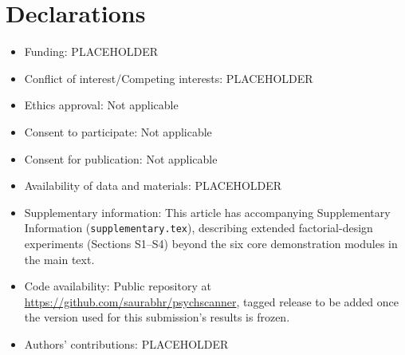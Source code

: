 \documentclass[pdflatex,sn-nature]{sn-jnl}
\begin{document}
\backmatter


\section*{Declarations}

\begin{itemize}
\item Funding: PLACEHOLDER
\item Conflict of interest/Competing interests: PLACEHOLDER
\item Ethics approval: Not applicable
\item Consent to participate: Not applicable
\item Consent for publication: Not applicable
\item Availability of data and materials: PLACEHOLDER
\item Supplementary information: This article has accompanying Supplementary
  Information (\texttt{supplementary.tex}), describing extended
  factorial-design experiments (Sections S1--S4) beyond the six core
  demonstration modules in the main text.
\item Code availability: Public repository at
  \url{https://github.com/saurabhr/psychscanner}, tagged release to be added
  once the version used for this submission's results is frozen.
\item Authors' contributions: PLACEHOLDER
\end{itemize}


\end{document}
